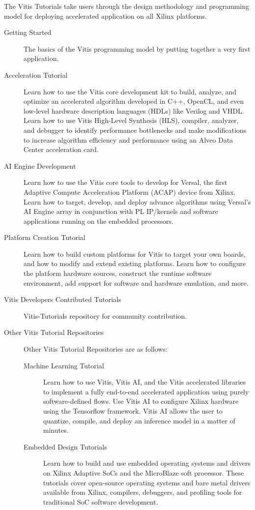 The Vitis Tutorials take users through the design methodology and programming model for deploying accelerated application on all Xilinx platforms.

\begin{description}
    \item [Getting Started] The basics of the Vitis programming model by putting together a very first application.
    \item [Acceleration Tutorial] Learn how to use the Vitis core development kit to build, analyze, and optimize an accelerated algorithm developed in C++, OpenCL, and even low-level hardware description languages (HDLs) like Verilog and VHDL. Learn how to use Vitis High-Level Synthesis (HLS), compiler, analyzer, and debugger to identify performance bottlenecks and make modifications to increase algorithm efficiency and performance using an Alveo Data Center acceleration card.
    \item [AI Engine Development] Learn how to use the Vitis core tools to develop for Versal, the first Adaptive Compute Acceleration Platform (ACAP) device from Xilinx. Learn how to target, develop, and deploy advance algorithms using Versal's AI Engine array in conjunction with PL IP/kernels and software applications running on the embedded processors.
    \item [Platform Creation Tutorial] Learn how to build custom platforms for Vitis to target your own boards, and how to modify and extend existing platforms. Learn how to configure the platform hardware sources, construct the runtime software environment, add support for software and hardware emulation, and more.
    \item [Vitis Developers Contributed Tutorials] Vitis-Tutorials repository for community contribution. 
    \item [Other Vitis Tutorial Repositories] Other Vitis Tutorial Repositories are as follows:
    \begin{description}
        \item [Machine Learning Tutorial] Learn how to use Vitis, Vitis AI, and the Vitis accelerated libraries to implement a fully end-to-end accelerated application using purely software-defined flows. Use Vitis AI to configure Xilinx hardware using the Tensorflow framework. Vitis AI allows the user to quantize, compile, and deploy an inference model in a matter of minutes.
        \item [Embedded Design Tutorials] Learn how to build and use embedded operating systems and drivers on Xilinx Adaptive SoCs and the MicroBlaze soft processor. These tutorials cover open-source operating systems and bare metal drivers available from Xilinx, compilers, debuggers, and profiling tools for traditional SoC software development.
    \end{description}
\end{description}

